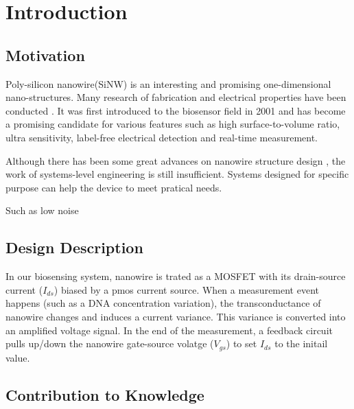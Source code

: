 \chapter{Introduction}
\section{Motivation}
Poly-silicon nanowire(SiNW) is an interesting and promising one-dimensional nano-structures. Many research of fabrication and electrical properties have been conducted \cite{J1}. It was first introduced to the biosensor field in 2001\cite{J2} and has become a promising candidate for various features such as high surface-to-volume ratio, ultra sensitivity, label-free electrical detection and  real-time measurement.

Although there has been some great advances on nanowire structure design \cite{J3}, the work of systems-level engineering is still insufficient.
Systems designed for specific purpose can help the device to meet pratical needs.


{\color{red}Such as low noise }


\section{Design Description}
In our biosensing system, nanowire is trated as a MOSFET with its drain-source current ($I_{ds}$)  biased by a pmos current source.
When a measurement event happens (such as a DNA concentration variation), the transconductance of nanowire changes and induces a current variance.
This variance is converted into an amplified voltage signal.
In the end of the measurement, a feedback circuit pulls up/down the nanowire gate-source volatge ($V_{gs}$) to set $I_{ds}$ to the initail value.



%

\section{Contribution to Knowledge}

